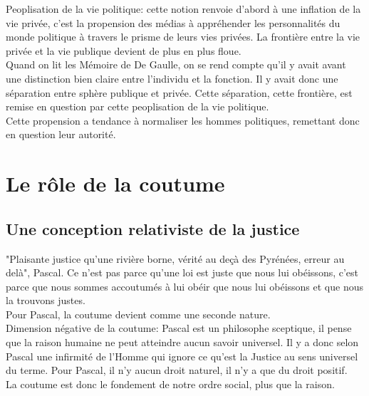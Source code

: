 \documentclass[10pt, a4paper, openany]{book}
\begin{document}
Peoplisation de la vie politique: cette notion renvoie d'abord à une inflation de la vie privée, c'est la propension des médias à appréhender les personnalités du monde politique à travers le prisme de leurs vies privées. La frontière entre la vie privée et la vie publique devient de plus en plus floue. \\
Quand on lit les Mémoire de De Gaulle, on se rend compte qu'il y avait avant une distinction bien claire entre l'individu et la fonction. Il y avait donc une séparation entre sphère publique et privée. Cette séparation, cette frontière, est remise en question par cette peoplisation de la vie politique. \\
Cette propension a tendance à normaliser les hommes politiques, remettant donc en question leur autorité. 

\section{Le rôle de la coutume}

\subsection{Une conception relativiste de la justice}

"Plaisante justice qu'une rivière borne, vérité au deçà des Pyrénées, erreur au delà", Pascal. Ce n'est pas parce qu'une loi est juste que nous lui obéissons, c'est parce que nous sommes accoutumés à lui obéir que nous lui obéissons et que nous la trouvons justes. \\
Pour Pascal, la coutume devient comme une seconde nature. \\
Dimension négative de la coutume: Pascal est un philosophe sceptique, il pense que la raison humaine ne peut atteindre aucun savoir universel. Il y a donc selon Pascal une infirmité de l'Homme qui ignore ce qu'est la Justice au sens universel du terme. Pour Pascal, il n'y aucun droit naturel, il n'y a que du droit positif. \\
La coutume est donc le fondement de notre ordre social, plus que la raison.
\end{document}
